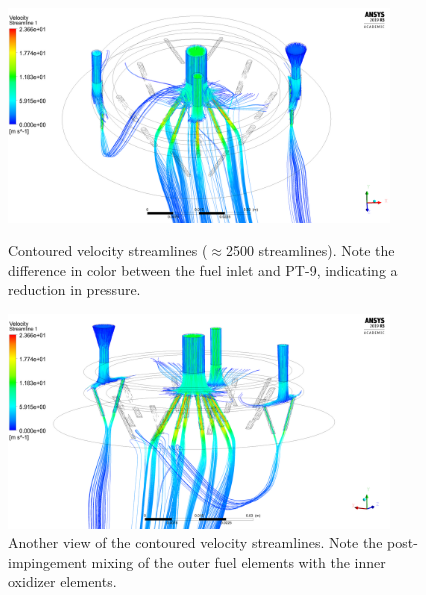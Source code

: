 \documentclass[9pt]{article} %
\numberwithin{equation}{section} %
\begin{document}
\begin{figure}
    \centering
    \begin{minipage}{0.49\textwidth}
        \centering
        \includegraphics[scale=0.5, width=0.9\textwidth]{sim_files/vel_streamline1.png} %
        \caption{Contoured velocity streamlines ($\approx$2500 streamlines). Note the difference in color between the fuel inlet and PT-9, indicating a reduction in pressure.}
        \label{fig:velocity_streamline_1}
    \end{minipage}\hfill
    \begin{minipage}{0.49\textwidth}
        \centering
        \includegraphics[scale=0.5, width=0.9\textwidth]{sim_files/vel_streamline2.png} %
        \caption{Another view of the contoured velocity streamlines. Note the post-impingement mixing of the outer fuel elements with the inner oxidizer elements.}
        \label{fig:velocity_streamline_2}
    \end{minipage}
\end{figure} 
\end{document}
